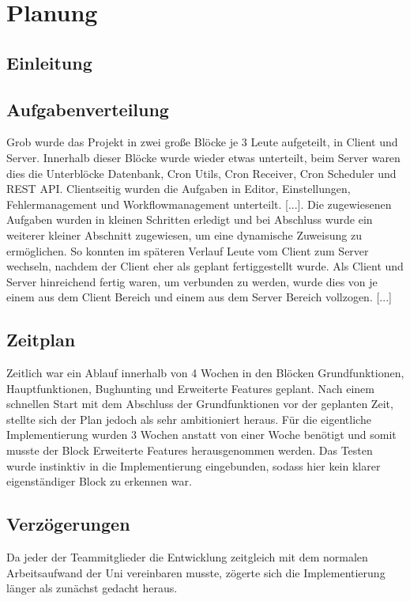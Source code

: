 \chapter{Planung}
    
    \section{Einleitung}
    
    \section{Aufgabenverteilung}
    \begin{flushleft}
    Grob wurde das Projekt in zwei große Blöcke je 3 Leute aufgeteilt, in Client und Server. Innerhalb dieser Blöcke wurde wieder etwas unterteilt, beim Server waren dies die Unterblöcke Datenbank, Cron Utils, Cron Receiver, Cron Scheduler und REST API. Clientseitig wurden die Aufgaben in Editor, Einstellungen, Fehlermanagement und Workflowmanagement unterteilt. [...]. Die zugewiesenen Aufgaben wurden in kleinen Schritten erledigt und bei Abschluss wurde ein weiterer kleiner Abschnitt zugewiesen, um eine dynamische Zuweisung zu ermöglichen. So konnten im späteren Verlauf Leute vom Client zum Server wechseln, nachdem der Client eher als geplant fertiggestellt wurde. Als Client und Server hinreichend fertig waren, um verbunden zu werden, wurde dies von je einem aus dem Client Bereich und einem aus dem Server Bereich vollzogen. [...]
    \end{flushleft}
    
    \section{Zeitplan}
    \begin{flushleft}
    Zeitlich war ein Ablauf innerhalb von 4 Wochen in den Blöcken Grundfunktionen, Hauptfunktionen, Bughunting und Erweiterte Features geplant. Nach einem schnellen Start mit dem Abschluss der Grundfunktionen vor der geplanten Zeit, stellte sich der Plan jedoch als sehr ambitioniert heraus. Für die eigentliche Implementierung wurden 3 Wochen anstatt von einer Woche benötigt und somit musste der Block Erweiterte Features herausgenommen werden. Das Testen wurde instinktiv in die Implementierung eingebunden, sodass hier kein klarer eigenständiger Block zu erkennen war. 
    \end{flushleft}
    
    \section{Verzögerungen}
    \begin{flushleft}
    Da jeder der Teammitglieder die Entwicklung zeitgleich mit dem normalen Arbeitsaufwand der Uni vereinbaren musste, zögerte sich die Implementierung länger als zunächst gedacht heraus.
    \end{flushleft}
    
